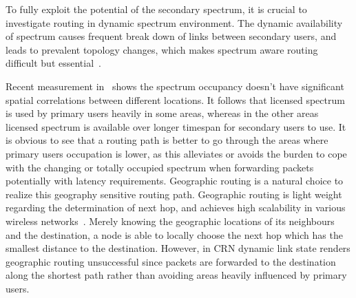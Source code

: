 To fully exploit the potential of the secondary spectrum, it is crucial to investigate routing in dynamic spectrum environment.
The dynamic availability of spectrum causes frequent break down of links between secondary users, and leads to prevalent topology changes, which makes spectrum aware routing difficult but essential~\cite{routing_CRN_challenges_solutions_2011}.

Recent measurement in~\cite{measurement_Palaios14} shows the spectrum occupancy doesn't have significant spatial correlations between different locations.
It follows that licensed spectrum is used by primary users heavily in some areas, whereas in the other areas licensed spectrum is available over longer timespan for secondary users to use.
It is obvious to see that a routing path is better to go through the areas where primary users occupation is lower, as this alleviates or avoids the burden to cope with the changing or totally occupied spectrum when forwarding packets potentially with latency requirements.
Geographic routing is a natural choice to realize this geography sensitive routing path.
Geographic routing is light weight regarding the determination of next hop, and achieves high scalability in various wireless networks~\cite{geoRouing-qos-2009}. %
Merely knowing the geographic locations of its neighbours and the destination, a node is able to locally choose the next hop which has the smallest distance to the destination.
However, in CRN dynamic link state renders geographic routing unsuccessful since packets are forwarded to the destination along the shortest path rather than avoiding areas heavily influenced by primary users.

